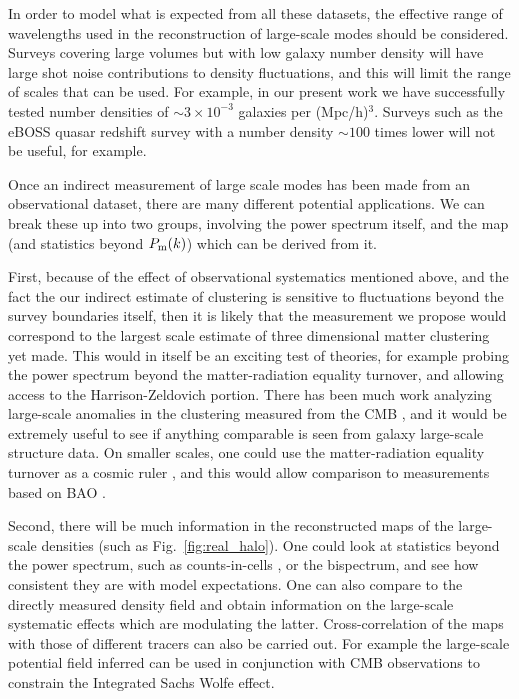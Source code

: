 \documentclass[prd,amsmath,amssymb,floatfix,superscriptaddress,nofootinbib,twocolumn]{revtex4-1}
\newcommand{\rf}[1]{\ref{fig:#1}}
\begin{document}
In order to model what is expected from all these datasets, the effective range of wavelengths used in the reconstruction of large-scale modes should be considered. Surveys covering large volumes but with low galaxy number density will have large shot noise contributions to density fluctuations, and this will limit the range of scales that can be used. For example, in our present work we have successfully tested number densities of $\sim 3\times10^{-3}$ galaxies per (Mpc/h)$^{3}$. Surveys such as the eBOSS quasar redshift survey \cite{Ata:2017dya} with a number density $\sim 100$ times lower will not be useful, for example.

Once an indirect measurement of large scale modes has been made from an observational dataset, there are many different potential applications. We can break these up into two groups, involving the power spectrum itself, and the map (and statistics beyond $P_{\rm m}(k)$) which can be derived from it.

First, because of the effect of observational systematics mentioned above, and the fact the our indirect estimate of clustering is sensitive to fluctuations beyond the survey boundaries itself, then it is likely that the measurement we propose would correspond to the largest scale estimate of three dimensional matter clustering yet made. This would in itself be an exciting test of theories, for example probing the power spectrum beyond the matter-radiation equality turnover, and allowing access to the Harrison-Zeldovich portion. There has been much work analyzing large-scale anomalies in the clustering measured from the CMB \cite{Copi:2010na}\cite{Rassat:2014yna}\cite{Schwarz:2015cma}, and it would be extremely useful to see if anything comparable is seen from galaxy large-scale structure data. On smaller scales, one could use the matter-radiation equality turnover as a cosmic ruler \cite{Hasenkamp:2012ii}, and this would allow comparison to measurements based on BAO \cite{Lazkoz:2007cc}.

Second, there will be much information in the reconstructed maps of the large-scale densities (such as Fig.~\rf{real_halo}). One could look at statistics beyond the power spectrum, such as counts-in-cells \cite{Yang:2011cic}, or the bispectrum, and see how consistent they are with model expectations. One can also compare to the directly measured density field and obtain information on the large-scale systematic effects which are modulating the latter. Cross-correlation of the maps with those of different tracers can also be carried out. For example the large-scale potential field inferred can be used in conjunction with CMB observations to constrain the Integrated Sachs Wolfe effect\cite{Nishizawa:2014vga}.
\end{document}

